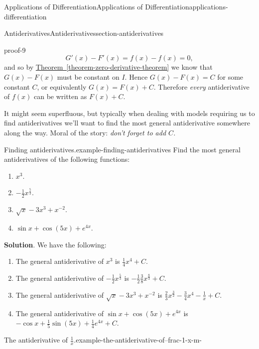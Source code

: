 \documentclass[oneside,10pt,]{book}
\numberwithin{equation}{section}
\begin{document}
\begin{chapterptx}{Applications of Differentiation}{}{Applications of Differentiation}{}{}{applications-differentiation}
\begin{sectionptx}{Antiderivatives}{}{Antiderivatives}{}{}{section-antiderivatives}
\begin{proofptx}{}{proof-9}
\begin{equation*}
G'(x) - F'(x) = f(x) - f(x) = 0,
\end{equation*}
and so by \hyperref[theorem-zero-derivative-theorem]{Theorem~\ref{theorem-zero-derivative-theorem}} we know that \(G(x) - F(x)\) must be constant on \(I\). Hence \(G(x) - F(x) = C\) for some constant \(C\), or equivalently \(G(x) = F(x)+C\). Therefore \emph{every} antiderivative of \(f(x)\) can be written as \(F(x) + C\).%
\end{proofptx}
\hypertarget{p-384}{}%
It might seem superfluous, but typically when dealing with models requiring us to find antiderivatives we'll want to find the most general antiderivative somewhere along the way. Moral of the story: \emph{don't forget to add \(C\).}%
\begin{example}{Finding antiderivatives.}{example-finding-antiderivatives}%
\hypertarget{p-385}{}%
Find the most general antiderivatives of the following functions:\leavevmode%
\begin{enumerate}
\item\hypertarget{li-28}{}\(x^{3}.\)%
\item\hypertarget{li-29}{}\(-\frac{1}{2}x^{\frac{5}{3}}.\)%
\item\hypertarget{li-30}{}\(\sqrt{x} - 3x^{3} + x^{-2}.\)%
\item\hypertarget{li-31}{}\(\sin x + \cos (5x) + e^{4x}.\)%
\end{enumerate}
%
\par\smallskip%
\noindent\textbf{Solution}.\hypertarget{solution-85}{}\quad%
\hypertarget{p-386}{}%
We have the following:\leavevmode%
\begin{enumerate}
\item\hypertarget{li-32}{}The general antiderivative of \(x^{3}\) is \(\frac{1}{4}x^{4}+C.\)%
\item\hypertarget{li-33}{}The general antiderivative of \(-\frac{1}{2}x^{\frac{5}{3}}\) is \(-\frac{1}{2}\frac{3}{8}x^{\frac{8}{3}}+C.\)%
\item\hypertarget{li-34}{}The general antiderivative of \(\sqrt{x} - 3x^{3} + x^{-2}\) is \(\frac{2}{3}x^{\frac{3}{2}} - \frac{3}{4}x^{4} - \frac{1}{x} + C\).%
\item\hypertarget{li-35}{}The general antiderivative of \(\sin x + \cos (5x) + e^{4x}\) is \(-\cos x + \frac{1}{5}\sin(5x) + \frac{1}{4}e^{4x} + C.\)%
\end{enumerate}
%
\end{example}
\begin{example}{The antiderivative of \(\frac{1}{x}\).}{example-the-antiderivative-of--frac-1-x-m-}%

\end{example}
\end{sectionptx}
\end{chapterptx}
\end{document}
